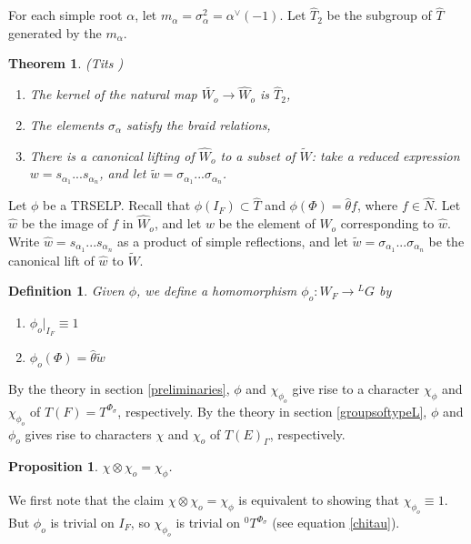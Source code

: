 \documentclass[11pt]{amsart}
\theoremstyle{plain}
\newtheorem{theorem}[enumi]{Theorem}
\newtheorem{proposition}[enumi]{Proposition}
\newtheorem{definition}[enumi]{Definition}
\begin{document}
For each simple root $\alpha$, let $m_{\alpha} = \sigma_{\alpha}^2 = \alpha^{\vee}(-1)$.  Let $\hat{T}_2$ be the subgroup of $\hat{T}$ generated by the $m_{\alpha}$.

\begin{theorem}{(Tits \cite{tits})}
\begin{enumerate}
\item The kernel of the natural map $\widetilde{W_o} \rightarrow \hat{W}_o$ is $\hat{T}_2$,
\item The elements $\sigma_{\alpha}$ satisfy the braid relations,
\item There is a canonical lifting of $\hat{W}_o$ to a subset of $\widetilde{W}$: take a reduced expression $w = s_{\alpha_1} ... s_{\alpha_n}$, and let $\tilde{w} = \sigma_{\alpha_1} ... \sigma_{\alpha_n}$.
\end{enumerate}
\end{theorem}

Let $\phi$ be a TRSELP.  Recall that $\phi(I_F) \subset \hat{T}$ and $\phi(\Phi) = \hat{\theta} f$, where $f \in \hat{N}$.  Let $\hat{w}$ be the image of $f$ in $\hat{W}_o$, and let $w$ be the element of $W_o$ corresponding to $\hat{w}$.  Write $\hat{w} = s_{\alpha_1} ... s_{\alpha_n}$ as a product of simple reflections, and let $\tilde{w} = \sigma_{\alpha_1} ... \sigma_{\alpha_n}$ be the canonical lift of $\hat{w}$ to $\widetilde{W}$.

\begin{definition}
Given $\phi$, we define a homomorphism $\phi_o : W_F \rightarrow {}^L G$ by
\begin{enumerate}
\item $\phi_o|_{I_F} \equiv 1$
\item $\phi_o(\Phi) = \hat{\theta} \tilde{w}$
\end{enumerate}
\end{definition}

By the theory in section \ref{preliminaries}, $\phi$ and $\chi_{\phi_o}$ give rise to a character $\chi_{\phi}$ and $\chi_{\phi_o}$ of $T(F) = T^{\Phi_{\sigma}}$, respectively.  By the theory in section \ref{groupsoftypeL}, $\phi$ and $\phi_o$ gives rise to  characters $\chi$ and $\chi_o$ of $T(E)_{\Gamma}$, respectively.

\begin{proposition}
$\chi \otimes \chi_o = \chi_{\phi}$.
\end{proposition}

\proof
We first note that the claim $\chi \otimes \chi_o = \chi_{\phi}$ is equivalent to showing that $\chi_{\phi_o} \equiv 1$.  But $\phi_o$ is trivial on $I_F$, so $\chi_{\phi_o}$ is trivial on ${}^0 T^{\Phi_{\sigma}}$ (see equation \ref{chitau}).
\end{document}
